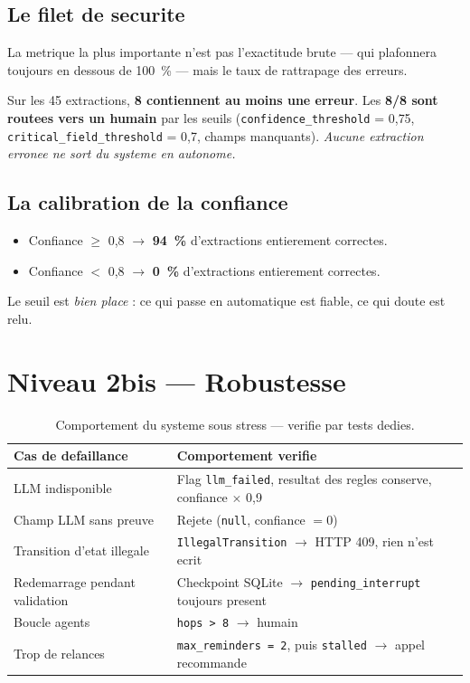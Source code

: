 \documentclass[12pt,a4paper,openany]{report}
\begin{document}
\subsection{Le filet de securite}
La metrique la plus importante n'est pas l'exactitude brute --- qui plafonnera toujours en dessous de 100~\% --- mais le taux de rattrapage des erreurs.

\begin{mechanismbox}
Sur les 45 extractions, \textbf{8 contiennent au moins une erreur}. Les \textbf{8/8 sont routees vers un humain} par les seuils (\texttt{confidence\_threshold} = 0{,}75, \texttt{critical\_field\_threshold} = 0{,}7, champs manquants). \emph{Aucune extraction erronee ne sort du systeme en autonome.}
\end{mechanismbox}

\subsection{La calibration de la confiance}
\begin{itemize}[leftmargin=1.5cm]
\item Confiance $\geq$ 0{,}8 $\longrightarrow$ \textbf{94~\%} d'extractions entierement correctes.
\item Confiance $<$ 0{,}8 $\longrightarrow$ \textbf{0~\%} d'extractions entierement correctes.
\end{itemize}
Le seuil est \emph{bien place} : ce qui passe en automatique est fiable, ce qui doute est relu.

\section{Niveau 2bis --- Robustesse}

\begin{table}[H]\centering\small
\caption{Comportement du systeme sous stress --- verifie par tests dedies.}
\label{tab:robustesse}
\begin{tabularx}{\textwidth}{X X}\toprule
\rowcolor{boxOrange!30}\textbf{Cas de defaillance} & \textbf{Comportement verifie}\\\midrule
LLM indisponible               & Flag \texttt{llm\_failed}, resultat des regles conserve, confiance $\times$ 0{,}9\\
Champ LLM sans preuve          & Rejete (\texttt{null}, confiance $= 0$)\\
Transition d'etat illegale     & \texttt{IllegalTransition} $\rightarrow$ HTTP 409, rien n'est ecrit\\
Redemarrage pendant validation & Checkpoint SQLite $\rightarrow$ \texttt{pending\_interrupt} toujours present\\
Boucle agents                  & \texttt{hops > 8} $\rightarrow$ humain\\
Trop de relances               & \texttt{max\_reminders = 2}, puis \texttt{stalled} $\rightarrow$ appel recommande\\
\bottomrule
\end{tabularx}
\end{table}
\end{document}
